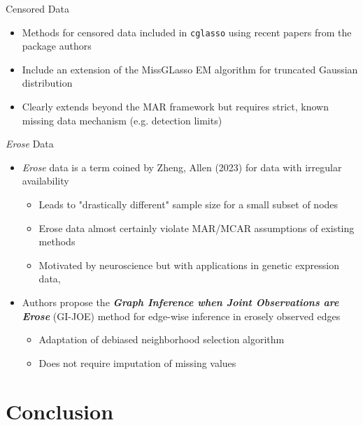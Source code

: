 \documentclass{beamer}
\begin{document}
\begin{frame}{Censored Data}
    \begin{itemize}
        \item Methods for censored data included in \texttt{cglasso} using recent papers from the package authors \cite{augugliaro_conditional_2020,augugliaro_ell_1_2018}
        \item Include an extension of the MissGLasso EM algorithm for truncated Gaussian distribution 
        \item Clearly extends beyond the MAR framework but requires strict, known missing data mechanism (e.g. detection limits)
    \end{itemize}
\end{frame}



\begin{frame}{{\it Erose} Data}
    \begin{itemize}
        \item {\it Erose} data is a term coined by Zheng, Allen (2023) for data with irregular availability \cite{zheng_gi-joe_2023}
        \begin{itemize}
            \item Leads to "drastically different" sample size for a small subset of nodes 
            \item Erose data almost certainly violate MAR/MCAR assumptions of existing methods 
            \item Motivated by neuroscience but with applications in genetic expression data, 
        \end{itemize}
        \item Authors propose the {\it \bf{G}raph \bf{I}nference when \bf{J}oint \bf{O}bservations are \bf{Erose}} (GI-JOE) method for edge-wise inference in erosely observed edges 
        \begin{itemize}
            \item Adaptation of debiased neighborhood selection algorithm 
            \item Does not require imputation of missing values
        \end{itemize}
    \end{itemize} 
\end{frame}



\section*{Conclusion}
\end{document}
